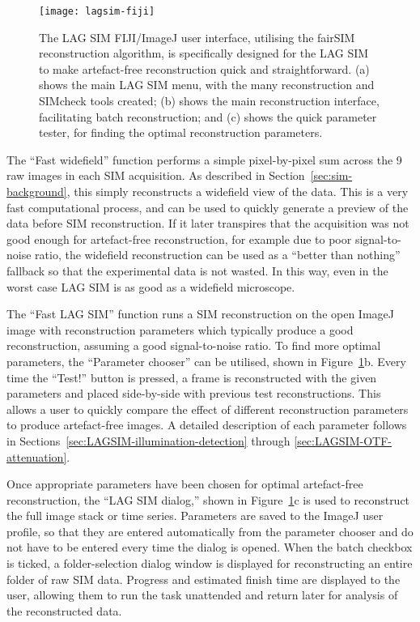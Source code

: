 \begin{figure}[htbp!]
	\centering
		\texttt{[image: lagsim-fiji]}	
	\caption[LAG SIM: A Fiji interface makes artefact-free reconstruction quick and simple for non-expert users]{The LAG SIM FIJI/ImageJ user interface, utilising the fairSIM reconstruction algorithm, is specifically designed for the LAG SIM to make artefact-free reconstruction quick and straightforward. (a) shows the main LAG SIM menu, with the many reconstruction and SIMcheck tools created; (b) shows the main reconstruction interface, facilitating batch reconstruction; and (c) shows the quick parameter tester, for finding the optimal reconstruction parameters. } %
\label{fig:lagsim-fiji-interface}
\end{figure}

The ``Fast widefield'' function performs a simple pixel-by-pixel sum across the 9 raw images in each SIM acquisition. 
As described in Section~\ref{sec:sim-background}, this simply reconstructs a widefield view of the data.
This is a very fast computational process, and can be used to quickly generate a preview of the data before SIM reconstruction. 
If it later transpires that the acquisition was not good enough for artefact-free reconstruction, for example due to poor signal-to-noise ratio, the widefield reconstruction can be used as a ``better than nothing'' fallback so that the experimental data is not wasted. 
In this way, even in the worst case LAG SIM is as good as a widefield microscope. 

The ``Fast LAG SIM'' function runs a SIM reconstruction on the open ImageJ image with reconstruction parameters which typically produce a good reconstruction, assuming a good signal-to-noise ratio. 
To find more optimal parameters, the ``Parameter chooser'' can be utilised, shown in Figure~\ref{fig:lagsim-fiji-interface}b. 
Every time the ``Test!'' button is pressed, a frame is reconstructed with the given parameters and placed side-by-side with previous test reconstructions.
This allows a user to quickly compare the effect of different reconstruction parameters to produce artefact-free images. 
A detailed description of each parameter follows in Sections~\ref{sec:LAGSIM-illumination-detection} through \ref{sec:LAGSIM-OTF-attenuation}. 

Once appropriate parameters have been chosen for optimal artefact-free reconstruction, the ``LAG SIM dialog,'' shown in Figure~\ref{fig:lagsim-fiji-interface}c is used to reconstruct the full image stack or time series. 
Parameters are saved to the ImageJ user profile, so that they are entered automatically from the parameter chooser and do not have to be entered every time the dialog is opened. 
When the batch checkbox is ticked, a folder-selection dialog window is displayed for reconstructing an entire folder of raw SIM data. 
Progress and estimated finish time are displayed to the user, allowing them to run the task unattended and return later for analysis of the reconstructed data. 

